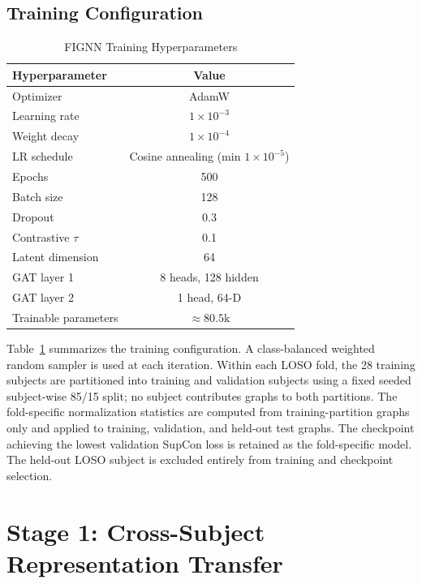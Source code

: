 \documentclass{ieeeaccess}
\begin{document}
\subsection{Training Configuration}

\begin{table}[!t]
  \caption{FIGNN Training Hyperparameters}
  \label{tab:hyperparams}
  \centering
  \begin{tabular}{lc}
    \toprule
    \textbf{Hyperparameter} & \textbf{Value} \\
    \midrule
    Optimizer              & AdamW \\
    Learning rate          & $1\times10^{-3}$ \\
    Weight decay           & $1\times10^{-4}$ \\
    LR schedule            & Cosine annealing (min $1\times10^{-5}$) \\
    Epochs                 & 500 \\
    Batch size             & 128 \\
    Dropout                & 0.3 \\
    Contrastive $\tau$     & 0.1 \\
    Latent dimension       & 64 \\
    GAT layer 1            & 8 heads, 128 hidden \\
    GAT layer 2            & 1 head, 64-D \\
    Trainable parameters   & ${\approx}80.5$k \\
    \bottomrule
  \end{tabular}
\end{table}

Table~\ref{tab:hyperparams} summarizes the training configuration. A
class-balanced weighted random sampler is used at each iteration. Within each
LOSO fold, the 28 training subjects are partitioned into training and validation
subjects using a fixed seeded subject-wise 85/15 split; no subject contributes
graphs to both partitions. The fold-specific normalization statistics are
computed from training-partition graphs only and applied to training,
validation, and held-out test graphs. The checkpoint achieving the lowest
validation SupCon loss is retained as the fold-specific model. The held-out
LOSO subject is excluded entirely from training and checkpoint selection.

\section{Stage 1: Cross-Subject Representation Transfer}
\label{sec:stage1}
\end{document}
